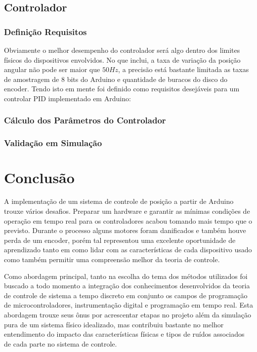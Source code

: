 \documentclass[a4paper,11pt]{article}
\begin{document}
\subsection{Controlador}

\subsubsection{Definição Requisitos}

Obviamente o melhor desempenho do controlador será algo dentro dos limites físicos do dispositivos envolvidos. No que inclui, a taxa de variação da posição angular não pode ser maior que $50Hz$, a precisão está bastante limitada as taxas de amostragem de 8 bits do Arduino e quantidade de buracos do disco do encoder. Tendo isto em mente foi definido como requisitos desejáveis para um controlar PID implementado em Arduino:



\subsubsection{Cálculo dos Parâmetros do Controlador}


\subsubsection{Validação em Simulação}


\section{Conclusão}

A implementação de um sistema de controle de posição a partir de Arduino trouxe vários desafios. Preparar um hardware e garantir as mínimas condições de operação em tempo real para os controladores acabou tomando mais tempo que o previsto. Durante o processo alguns motores foram danificados e também houve perda de um encoder, porém tal representou uma excelente oportunidade de aprendizado tanto em como lidar com as características de cada dispositivo usado como também permitir uma compreensão melhor da teoria de controle.

Como abordagem principal, tanto na escolha do tema dos métodos utilizados foi buscado a todo momento a integração dos conhecimentos desenvolvidos da teoria de controle de sistema a tempo discreto em conjunto os campos de programação de microcontroladores, instrumentação digital e programação em tempo real. Esta abordagem trouxe seus ônus por acrescentar etapas no projeto além da simulação pura de um sistema físico idealizado, mas contribuiu bastante no melhor entendimento do impacto das características físicas e tipos de ruídos associados de cada parte no sistema de controle.
\end{document}

